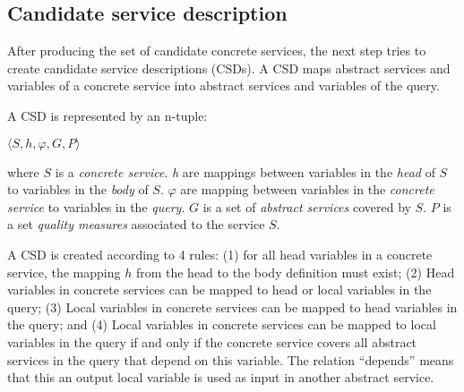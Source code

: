 
\subsection{Candidate service description}

After producing the set of candidate concrete services, the next step tries 
to create candidate service descriptions (CSDs). 
A CSD maps abstract services and variables of a concrete service into abstract 
services and variables of the query. 

\begin{defi}
A CSD is represented by an n-tuple:
\begin{center}
$\langle S, h, \varphi, G, P\rangle$
\end{center}
where $S$ is a \textit{concrete service}. 
\textit{h} are mappings between variables in the \textit{head} of $S$ to variables in the \textit{body} of $S$. 
$\varphi$ are mapping between variables in the \textit{concrete service} to variables in the \textit{query}.
$G$ is a set of \textit{abstract services} covered by $S$. 
$P$ is a set \textit{quality measures} associated to the service $S$. 
\end{defi} 
 
A CSD is created according to 4 rules: (1) for all head variables in a concrete service, the mapping $h$ from the head to the body definition must exist; (2) Head variables in concrete services can be mapped to head or local variables in the query; (3) Local variables in concrete services can be mapped to head variables in the query;
and (4) Local variables in concrete services can be mapped to local
variables in the query if and only if the concrete service covers all abstract services in the query that depend on this variable. The relation ``depends''  means that this an output local variable is used as input in another abstract service. 


